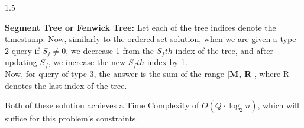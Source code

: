 \documentclass[12pt]{article}
\begin{document}
\begin{spacing}{1.5}
\vspace{.2cm}

{\large \textbf{Segment Tree or Fenwick Tree:} Let each of the tree indices denote the timestamp. Now, similarly to the ordered set solution, when we are given a type 2 query if $S_f \neq 0$, we decrease 1 from the $S_fth$ index of the tree, and after updating $S_f$, we increase the new $S_fth$ index by 1. 
\\Now, for query of type 3, the answer is the sum of the range \textbf{[M, R]}, where R denotes the last index of the tree. }

\vspace{0.6cm}

{\large Both of these solution achieves a Time Complexity of $O(Q \cdot \log_{2}{n})$, which will suffice for this problem's constraints.  }

\end{spacing}
\end{document}
